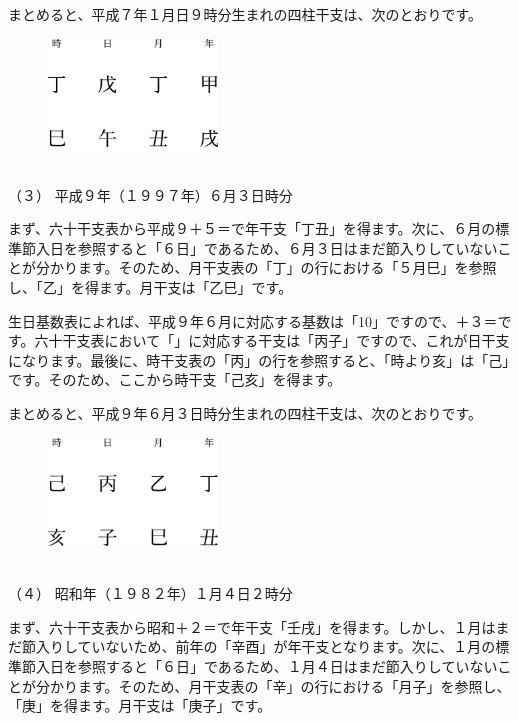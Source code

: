 \documentclass[a5paper,11pt,dvipdfmx]{tarticle}
\begin{document}
まとめると、平成７年１月日９時分生まれの四柱干支は、次のとおりです。

\begin{figure}[h]
  \includegraphics[width=45mm,angle=90]{figs/figure3-5.eps}
\end{figure}

\noindent
\\（３） 平成９年（１９９７年）６月３日時分

まず、六十干支表から平成９＋５＝で年干支「丁丑」を得ます。次に、６月の標準節入日を参照すると「６日」であるため、６月３日はまだ節入りしていないことが分かります。そのため、月干支表の「丁」の行における「５月巳」を参照し、「乙」を得ます。月干支は「乙巳」です。

生日基数表によれば、平成９年６月に対応する基数は「10」ですので、＋３＝です。六十干支表において「」に対応する干支は「丙子」ですので、これが日干支になります。最後に、時干支表の「丙」の行を参照すると、「時より亥」は「己」です。そのため、ここから時干支「己亥」を得ます。

まとめると、平成９年６月３日時分生まれの四柱干支は、次のとおりです。

\begin{figure}[h]
  \includegraphics[width=45mm,angle=90]{figs/figure3-6.eps}
\end{figure}

\noindent
\\（４） 昭和年（１９８２年）１月４日２時分

まず、六十干支表から昭和＋２＝で年干支「壬戌」を得ます。しかし、１月はまだ節入りしていないため、前年の「辛酉」が年干支となります。次に、１月の標準節入日を参照すると「６日」であるため、１月４日はまだ節入りしていないことが分かります。そのため、月干支表の「辛」の行における「月子」を参照し、「庚」を得ます。月干支は「庚子」です。
\end{document}

